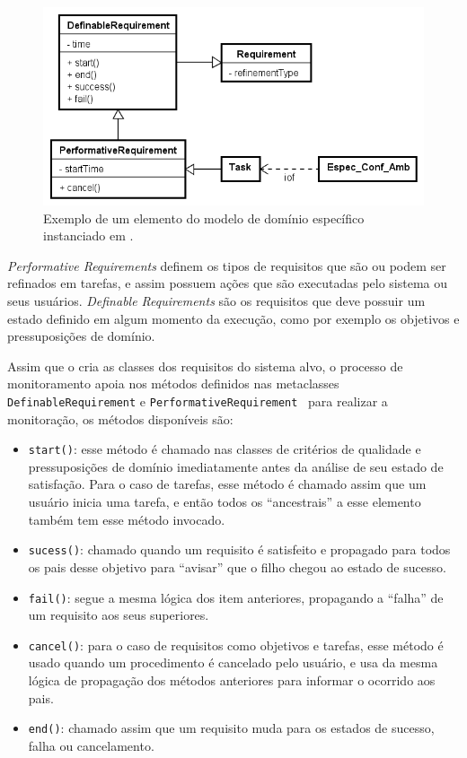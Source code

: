 \begin{figure}[h]
	\centering
	\includegraphics[width=1\textwidth]{figuras/exemplos-emf/exemplo-instanciacao-ecore.PNG}
	\caption{Exemplo de um elemento do modelo de domínio específico instanciado em \zanshin.}
	\label{exemplo-instanciacao-ecore}
\end{figure}

\textit{Performative Requirements} definem os tipos de requisitos que são ou podem ser refinados em tarefas, e assim possuem ações que são executadas pelo sistema ou seus usuários. \textit{Definable Requirements} são os requisitos que deve possuir um estado definido em algum momento da execução, como por exemplo os objetivos e pressuposições de domínio.

Assim que o \zanshin cria as classes dos requisitos do sistema alvo, o processo de monitoramento apoia nos métodos definidos nas metaclasses \texttt{DefinableRequirement} e \texttt{PerformativeRequirement}~\cite{tesevitor} para realizar a monitoração, os métodos disponíveis são:
\begin{itemize}
	\item \texttt{start()}: esse método é chamado nas classes de critérios de qualidade e pressuposições de domínio imediatamente antes da análise de seu estado de satisfação. Para o caso de tarefas, esse método é chamado assim que um usuário inicia uma tarefa, e então todos os ``ancestrais'' a esse elemento também tem esse método invocado.
	\item \texttt{sucess()}: chamado quando um requisito é satisfeito e propagado para todos os pais desse objetivo para ``avisar'' que o filho chegou ao estado de sucesso.
	\item \texttt{fail()}: segue a mesma lógica dos item anteriores, propagando a ``falha'' de um requisito aos seus superiores.
	\item \texttt{cancel()}: para o caso de requisitos como objetivos e tarefas, esse método é usado quando um procedimento é cancelado pelo usuário, e usa da mesma lógica de propagação dos métodos anteriores para informar o ocorrido aos pais.
	\item \texttt{end()}: chamado assim que um requisito muda para os estados de sucesso, falha ou cancelamento.
\end{itemize}

